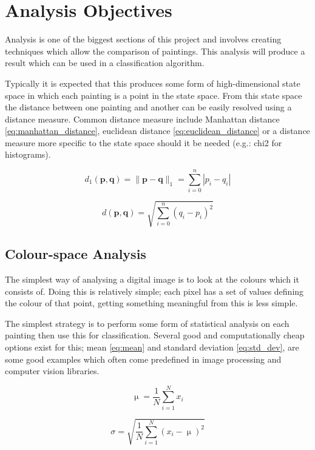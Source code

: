 \section{Analysis Objectives}
Analysis is one of the biggest sections of this project and involves creating techniques which 
allow the comparison of paintings. This analysis will produce a result which can be used in a
classification algorithm.

Typically it is expected that this produces some form of high-dimensional state space in which each
painting is a point in the state space. From this state space the distance between one painting
and another can be easily resolved using a distance measure. Common distance measure include Manhattan distance 
\eqref{eq:manhattan_distance}, euclidean distance \eqref{eq:euclidean_distance} or a distance 
measure more specific to the state space should it be needed (e.g.: \gls{chi2} for histograms).

\begin{equation}\label{eq:manhattan_distance}
d_1(\mathbf{p},\mathbf{q}) = \|\mathbf{p}-\mathbf{q}\|_1 = \sum^{n}_{i=0}{|p_i-q_i|}
\end{equation}

\begin{equation}\label{eq:euclidean_distance}
d(\mathbf{p}, \mathbf{q}) = \sqrt{\sum^{n}_{i=0}({q_i-p_i})^2}
\end{equation}

\subsection{Colour-space Analysis}
The simplest way of analysing a digital image is to look at the colours which it consists of.
Doing this is relatively simple; each pixel has a set of values defining the colour of that point,
getting something meaningful from this is less simple.

The simplest strategy is to perform some form of statistical analysis on each painting then use
this for classification. Several good and computationally cheap options exist for this; 
mean \eqref{eq:mean} and standard deviation \eqref{eq:std_dev}, are some good
examples which often come predefined in image processing and computer vision libraries.

\begin{equation}\label{eq:mean}
\upmu = \frac{1}{N}\sum_{i=1}^{N}x_i
\end{equation}

\begin{equation}\label{eq:std_dev}
\sigma = \sqrt{\frac{1}{N}\sum_{i=1}^{N}(x_i - \upmu)^2}
\end{equation}

